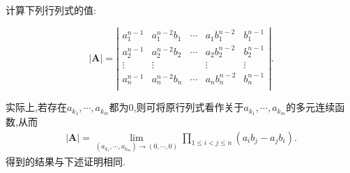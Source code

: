 \documentclass[../../main.tex]{subfiles}%
\begin{document}
\begin{proposition}\label{proposition:Vandermode行列式的"卷积"形式}
计算下列行列式的值:

\[
|\boldsymbol{A}|=\left| \begin{matrix}
a_{1}^{n-1}&		a_{1}^{n-2}b_1&		\cdots&		a_1b_{1}^{n-2}&		b_{1}^{n-1}\\
a_{2}^{n-1}&		a_{2}^{n-2}b_2&		\cdots&		a_2b_{2}^{n-2}&		b_{2}^{n-1}\\
\vdots&		\vdots&		&		\vdots&		\vdots\\
a_{n}^{n-1}&		a_{n}^{n-2}b_n&		\cdots&		a_nb_{n}^{n-2}&		b_{n}^{n-1}\\
\end{matrix} \right|.
\]
\end{proposition}
\begin{remark}
实际上,若存在$a_{k_1},\cdots,a_{k_m}$都为0,则可将原行列式看作关于$a_{k_1},\cdots,a_{k_m}$的多元连续函数,从而
\begin{align*}
|\boldsymbol{A}|=\underset{\left( a_{k_1},\cdots ,a_{k_m} \right) \rightarrow \left( 0,\cdots ,0 \right)}{\lim}\prod_{1\leqslant i<j\leqslant n}{(a_ib_j-a_jb_i)}.
\end{align*}
得到的结果与下述证明相同.
\end{remark}
\end{document}
